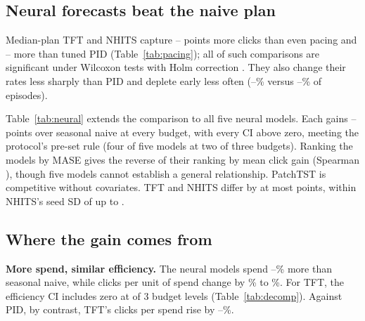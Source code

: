 \documentclass[sigconf,nonacm]{acmart}
\begin{document}
\subsection{Neural forecasts beat the naive plan}
Median-plan TFT and NHITS capture --
points more clicks than even pacing and --
more than tuned PID (Table~\ref{tab:pacing}); all
 of  such comparisons
are significant under Wilcoxon tests with Holm correction
\cite{wilcoxon1945individual,holm1979simple}. They also change their rates
less sharply than PID and deplete early less often
(--\% versus
--\% of episodes).

\begin{table}[tb]
  \caption{Five neural predictors. MASE averages campaigns and seeds (naive , LightGBM ). Gains and distances above the spend-matched naive scaling curve are in points.}
  \label{tab:neural}
  \small\setlength{\tabcolsep}{3pt}
  \resizebox{\linewidth}{!}{}
\end{table}

Table~\ref{tab:neural} extends the comparison to all five neural models. Each
gains -- points over seasonal naive at every
budget, with every CI above zero, meeting the protocol's pre-set rule (four of
five models at two of three budgets). Ranking the models by MASE gives the
reverse of their ranking by mean click gain (Spearman ),
though five models cannot establish a general relationship. PatchTST is
competitive without covariates. TFT and NHITS differ by at most
 points, within NHITS's seed SD of up to
.

\subsection{Where the gain comes from}
\begin{table}[tb]
  \caption{Median-plan comparisons. Click gains in points with 95\% CIs; spend and clicks per spend are relative changes.}
  \label{tab:decomp}
  \small\setlength{\tabcolsep}{3pt}
  \resizebox{\linewidth}{!}{}
\end{table}

\textbf{More spend, similar efficiency.} The neural models spend
--\% more than seasonal naive, while clicks
per unit of spend change by \% to \%. For TFT,
the efficiency CI includes zero at  of 3 budget levels
(Table~\ref{tab:decomp}). Against PID, by contrast, TFT's clicks per spend rise
by --\%.
\end{document}
